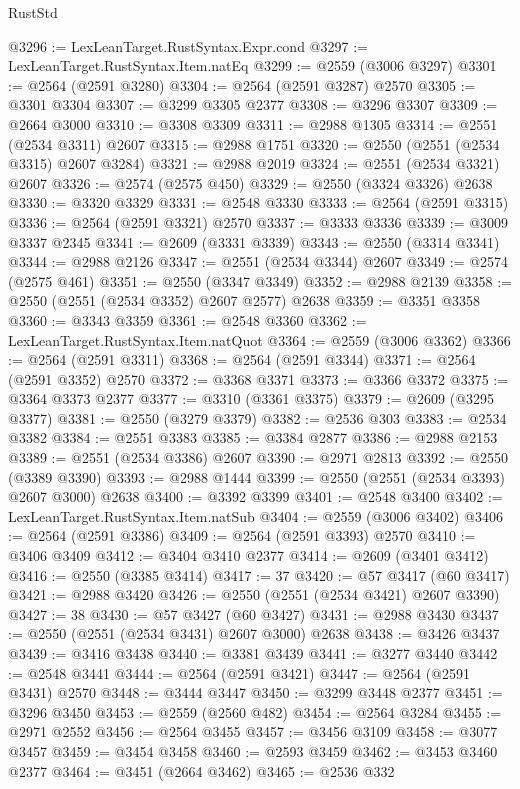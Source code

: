 \begin{lexlean}{RustStd}
\begin{coremodule}
@3296 := LexLeanTarget.RustSyntax.Expr.cond
@3297 := LexLeanTarget.RustSyntax.Item.natEq
@3299 := @2559 (@3006 @3297)
@3301 := @2564 (@2591 @3280)
@3304 := @2564 (@2591 @3287) @2570
@3305 := @3301 @3304
@3307 := @3299 @3305 @2377
@3308 := @3296 @3307
@3309 := @2664 @3000
@3310 := @3308 @3309
@3311 := @2988 @1305
@3314 := @2551 (@2534 @3311) @2607
@3315 := @2988 @1751
@3320 := @2550 (@2551 (@2534 @3315) @2607 @3284)
@3321 := @2988 @2019
@3324 := @2551 (@2534 @3321) @2607
@3326 := @2574 (@2575 @450)
@3329 := @2550 (@3324 @3326) @2638
@3330 := @3320 @3329
@3331 := @2548 @3330
@3333 := @2564 (@2591 @3315)
@3336 := @2564 (@2591 @3321) @2570
@3337 := @3333 @3336
@3339 := @3009 @3337 @2345
@3341 := @2609 (@3331 @3339)
@3343 := @2550 (@3314 @3341)
@3344 := @2988 @2126
@3347 := @2551 (@2534 @3344) @2607
@3349 := @2574 (@2575 @461)
@3351 := @2550 (@3347 @3349)
@3352 := @2988 @2139
@3358 := @2550 (@2551 (@2534 @3352) @2607 @2577) @2638
@3359 := @3351 @3358
@3360 := @3343 @3359
@3361 := @2548 @3360
@3362 := LexLeanTarget.RustSyntax.Item.natQuot
@3364 := @2559 (@3006 @3362)
@3366 := @2564 (@2591 @3311)
@3368 := @2564 (@2591 @3344)
@3371 := @2564 (@2591 @3352) @2570
@3372 := @3368 @3371
@3373 := @3366 @3372
@3375 := @3364 @3373 @2377
@3377 := @3310 (@3361 @3375)
@3379 := @2609 (@3295 @3377)
@3381 := @2550 (@3279 @3379)
@3382 := @2536 @303
@3383 := @2534 @3382
@3384 := @2551 @3383
@3385 := @3384 @2877
@3386 := @2988 @2153
@3389 := @2551 (@2534 @3386) @2607
@3390 := @2971 @2813
@3392 := @2550 (@3389 @3390)
@3393 := @2988 @1444
@3399 := @2550 (@2551 (@2534 @3393) @2607 @3000) @2638
@3400 := @3392 @3399
@3401 := @2548 @3400
@3402 := LexLeanTarget.RustSyntax.Item.natSub
@3404 := @2559 (@3006 @3402)
@3406 := @2564 (@2591 @3386)
@3409 := @2564 (@2591 @3393) @2570
@3410 := @3406 @3409
@3412 := @3404 @3410 @2377
@3414 := @2609 (@3401 @3412)
@3416 := @2550 (@3385 @3414)
@3417 := 37
@3420 := @57 @3417 (@60 @3417)
@3421 := @2988 @3420
@3426 := @2550 (@2551 (@2534 @3421) @2607 @3390)
@3427 := 38
@3430 := @57 @3427 (@60 @3427)
@3431 := @2988 @3430
@3437 := @2550 (@2551 (@2534 @3431) @2607 @3000) @2638
@3438 := @3426 @3437
@3439 := @3416 @3438
@3440 := @3381 @3439
@3441 := @3277 @3440
@3442 := @2548 @3441
@3444 := @2564 (@2591 @3421)
@3447 := @2564 (@2591 @3431) @2570
@3448 := @3444 @3447
@3450 := @3299 @3448 @2377
@3451 := @3296 @3450
@3453 := @2559 (@2560 @482)
@3454 := @2564 @3284
@3455 := @2971 @2552
@3456 := @2564 @3455
@3457 := @3456 @3109
@3458 := @3077 @3457
@3459 := @3454 @3458
@3460 := @2593 @3459
@3462 := @3453 @3460 @2377
@3464 := @3451 (@2664 @3462)
@3465 := @2536 @332

\end{coremodule}
\end{lexlean}
